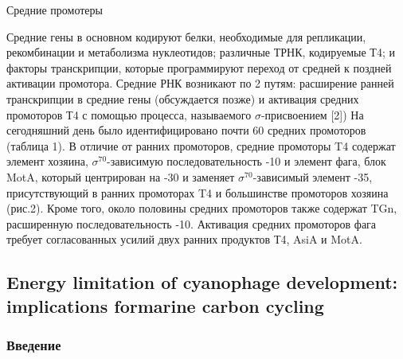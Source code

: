 \documentclass[a4paper,12pt]{article}
\begin{document}
        {\Large Средние промотеры}
        \par{Средние гены в основном кодируют белки, необходимые для репликации, рекомбинации и метаболизма нуклеотидов;
        различные ТРНК, кодируемые Т4; и факторы транскрипции, которые программируют переход от средней к поздней
        активации промотора. Средние РНК возникают по 2 путям: расширение ранней транскрипции в средние гены (обсуждается
        позже) и активация средних промоторов Т4 с помощью процесса, называемого $\sigma$-присвоением [2]) На сегодняшний
        день было идентифицировано почти 60 средних промоторов (таблица 1). В отличие от ранних промоторов, средние
        промоторы T4 содержат элемент хозяина, $\sigma^{70}$-зависимую последовательность -10 и элемент фага, блок MotA,
        который центрирован на -30 и заменяет $\sigma^{70}$-зависимый элемент -35, присутствующий в ранних промоторах T4
        и большинстве промоторов хозяина (рис.2). Кроме того, около половины средних промоторов также содержат TGn,
        расширенную последовательность -10. Активация средних промоторов фага требует согласованных усилий двух ранних
        продуктов Т4, AsiA и MotA.}
\begin{center}
    \item \subsection{Energy limitation of cyanophage development: implications formarine carbon cycling}
    \item \subsubsection{Введение}
\end{center}
\end{document}
